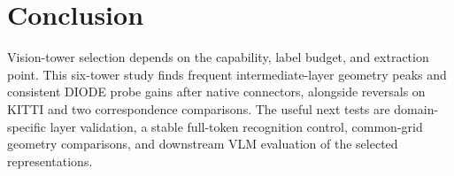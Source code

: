 \section{Conclusion}
Vision-tower selection depends on the capability, label budget, and extraction point.
This six-tower study finds frequent intermediate-layer geometry peaks and consistent
DIODE probe gains after native connectors, alongside reversals on KITTI and two
correspondence comparisons. The useful next tests are domain-specific layer validation,
a stable full-token recognition control, common-grid geometry comparisons, and downstream
VLM evaluation of the selected representations.
